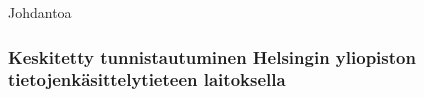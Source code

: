 Johdantoa

\subsubsection{Keskitetty tunnistautuminen Helsingin yliopiston tietojenkäsittelytieteen laitoksella}
